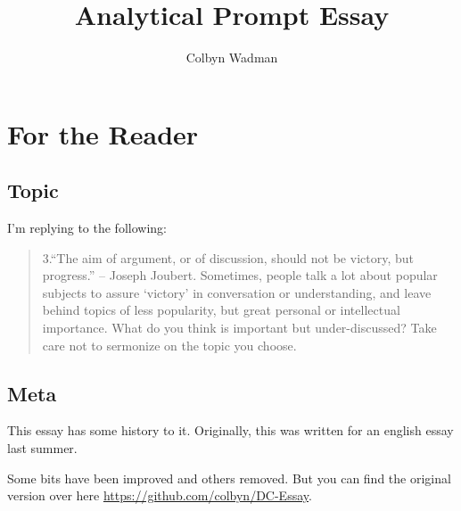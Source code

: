 \documentclass{article}
\title{Analytical Prompt Essay}
\author{Colbyn Wadman}
\begin{document}
\maketitle

 



\section{For the Reader}


\subsection{Topic}

I'm replying to the following:
\begin{quotation}
3.“The aim of argument, or of discussion, should not be victory, but progress.” – Joseph Joubert. Sometimes, people talk a lot about popular subjects to assure ‘victory’ in conversation or understanding, and leave behind topics of less popularity, but great personal or intellectual importance. What do you think is important but under-discussed? Take care not to sermonize on the topic you choose. 
\end{quotation}


\subsection{Meta}

This essay has some history to it. Originally, this was written for an english essay last summer. 

Some bits have been improved and others removed. But you can find the original version over here \url{https://github.com/colbyn/DC-Essay}.




\end{document}

